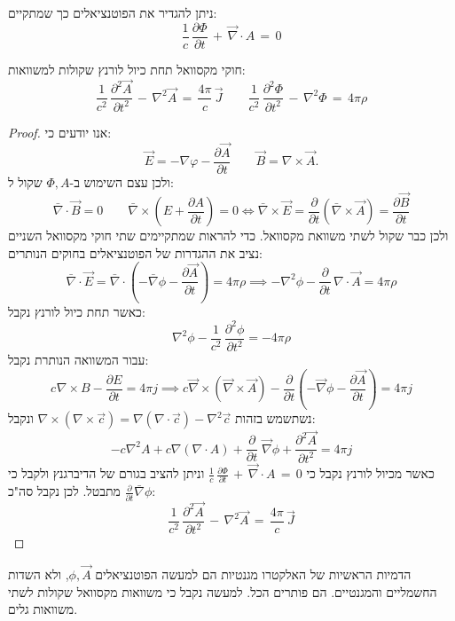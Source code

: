 \documentclass{tstextbook}
\begin{document}
\begin{definition}
ניתן להגדיר את הפוטנציאלים כך שמתקיים:
$${\frac{1}{c}}\,\frac{\partial\Phi}{\partial t}\,+\,{\vec\nabla\cdot A}\,=\,0$$

\end{definition}
\begin{proposition}
חוקי מקסוואל תחת כיול לורנץ שקולות למשוואות:
$${\frac{1}{c^{2}}}\,{\frac{\partial^{2}\vec{A}}{\partial t^{2}}}\,-\,\nabla^{2}\vec{A}\,=\,{\frac{4\pi}{c}}\,\vec{J}\qquad {\frac{1}{c^{2}}}\,{\frac{\partial^{2}\Phi}{\partial t^{2}}}\,-\,\nabla^{2}\Phi\,=\,4\pi\rho$$

\end{proposition}
\begin{proof}
אנו יודעים כי:
$$\vec{E}=-\nabla\varphi-{\frac{\partial\vec{A}}{\partial t}}\qquad\vec{B}=\nabla\times\vec{A}.$$
ולכן עצם השימוש ב-\(\Phi,A\)  שקול ל:
$$\bar{\nabla} \cdot \vec{B}=0\qquad \bar{\nabla} \times \left( E+\frac{\partial A}{\partial t}  \right)=0\iff \bar{\nabla} \times  \vec{E}=\frac{\partial }{\partial t} \left( \bar{\nabla} \times \vec{A} \right)=\frac{\partial \vec{B}}{\partial t} $$
ולכן כבר שקול לשתי משוואת מקסוואל. כדי להראות שמתקיימים שתי חוקי מקסוואל השניים נציב את ההגדרות של הפוטנציאלים בחוקים הנותרים:
$$\bar{\nabla} \cdot  \vec{E}=\bar{\nabla}\cdot\left(-\bar{\nabla}\phi-{\frac{\partial{\vec{A}}}{\partial t}}\right)=4\pi \rho \implies -\nabla^{2}\phi-{\frac{\partial}{\partial t}}\,\nabla\cdot{\vec{A}}=4\pi \rho$$
כאשר תחת כיול לורנץ נקבל:
$$\nabla^{2}\phi-{\frac{1}{c^{2}}}\,{\frac{\partial^{2}\phi}{\partial t^{2}}}=-4\pi \rho$$
עבור המשוואה הנותרת נקבל:
$$c^{}\nabla\times B-{\frac{\partial E}{\partial t}}=4\pi j\implies c{\vec{\nabla}}\times\left({\vec{\nabla}}\times{\vec{A}}\right)-{\frac{\partial}{\partial t}}\left(-{\vec{\nabla}}\phi-{\frac{\partial{\vec{A}}}{\partial t}}\right)=4\pi j$$
נשתשמש בזהות \(\nabla\times(\nabla\times\vec{c})=\nabla(\nabla\cdot\vec{c})-\nabla^{2}\vec{c}\) ונקבל:
$$-c\nabla^{2}A+c\nabla\left( \nabla\cdot A \right)+\frac{\partial}{\partial t}\;{\vec{\nabla}}\phi+\frac{\partial^{2}{\vec{A}}}{\partial t^{2}}=4\pi j$$
כאשר מכיול לורנץ נקבל כי \({\frac{1}{c}}\,\frac{\partial\Phi}{\partial t}\,+\,{\vec\nabla\cdot A}\,=\,0\) וניתן להציב בגורם של הדיברגנץ ולקבל כי \(\frac{\partial }{\partial t} \bar{\nabla}\phi\) מתבטל. לכן נקבל סה"כ:
$${\frac{1}{c^{2}}}\,{\frac{\partial^{2}\vec{A}}{\partial t^{2}}}\,-\,\nabla^{2}\vec{A}\,=\,{\frac{4\pi}{c}}\,\vec{J}$$

\end{proof}
הדמיות הראשיות של האלקטרו מגנטיות הם למעשה הפוטנציאלים \(\phi,\vec{A}\), ולא השדות החשמליים והמגנטיים. הם פותרים הכל. למעשה נקבל כי משוואות מקסוואל שקולות לשתי משוואות גלים.
\end{document}
